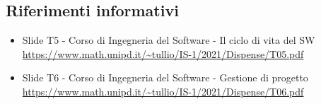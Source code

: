\subsection{Riferimenti informativi}
\begin{itemize}
  \item Slide T5 - Corso di Ingegneria del Software - Il ciclo di vita del SW \\
  \url{https://www.math.unipd.it/~tullio/IS-1/2021/Dispense/T05.pdf}
  \item Slide T6 - Corso di Ingegneria del Software - Gestione di progetto \\
  \url{https://www.math.unipd.it/~tullio/IS-1/2021/Dispense/T06.pdf}
\end{itemize}
